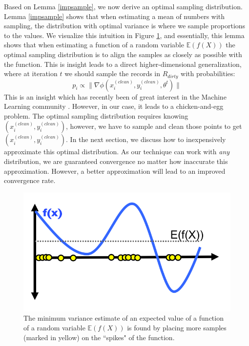 Based on Lemma \ref{impsample}, we now derive an optimal sampling distribution.
Lemma \ref{impsample} shows that when estimating a mean of numbers with sampling, the distribution with optimal variance is where we sample proportions to the values.
We visualize this intuition in Figure \ref{update-arch3}, and essentially, this lemma shows
that when estimating a function of a random variable $\mathbb{E}(f(X))$ the optimal sampling distribution is to align the samples as closely as possible with the function.
This is insight leads to a direct higher-dimensional generalization, where at iteration $t$ we should sample the records in $R_{dirty}$ with probabilities:
\[
p_i \propto \|\nabla\phi(x^{(clean)}_i,y^{(clean)}_i,\theta^t)\|
\]
This is an insight which has recently been of great interest in the Machine Learning community \cite{zhao2014stochastic}.
However, in our case, it leads to a chicken-and-egg problem.
The optimal sampling distribution requires knowing $(x^{(clean)}_i,y^{(clean)}_i)$, however, we have to sample and clean those points to get $(x^{(clean)}_i,y^{(clean)}_i)$.
In the next section, we discuss how to inexpensively approximate this optimal distribution.
As our technique can work with \emph{any} distribution, we are guaranteed convergence no matter how inaccurate this approximation.
However, a better approximation will lead to an improved convergence rate.

\begin{figure}[ht!]
\centering
 \includegraphics[width=0.6\columnwidth]{figs/update-arch3.png}
 \caption{The minimum variance estimate of an expected value of a function of a random variable $\mathbb{E}(f(X))$ is found by placing more samples (marked in yellow) on the ``spikes" of the function.\label{update-arch3}}
\end{figure}

